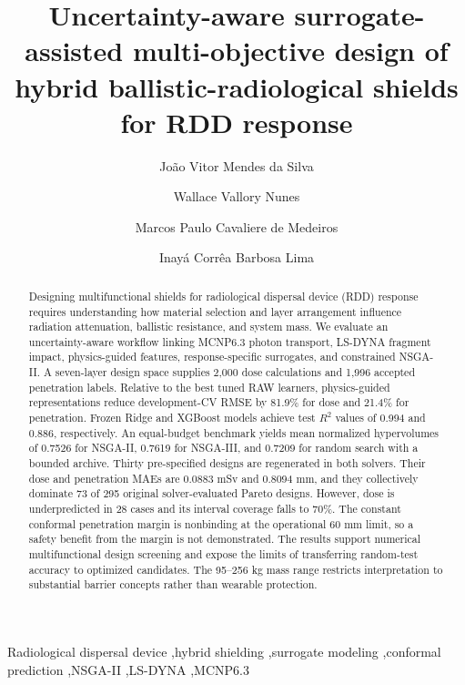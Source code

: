 \documentclass[12pt]{elsarticle}
\begin{document}
	
	\begin{frontmatter}
		
		\title{Uncertainty-aware surrogate-assisted multi-objective design of hybrid ballistic-radiological shields for RDD response}
		
		\author[pen]{Jo\~ao Vitor Mendes da Silva}
		\author[ime]{Wallace Vallory Nunes}
		\author[ime]{Marcos Paulo Cavaliere de Medeiros}
		\author[pen]{Inay\'a Corr\^ea Barbosa Lima}
			
		
		
		\begin{abstract}
Designing multifunctional shields for radiological dispersal device (RDD) response requires understanding how material selection and layer arrangement influence radiation attenuation, ballistic resistance, and system mass. We evaluate an uncertainty-aware workflow linking MCNP6.3 photon transport, LS-DYNA fragment impact, physics-guided features, response-specific surrogates, and constrained NSGA-II. A seven-layer design space supplies 2,000 dose calculations and 1,996 accepted penetration labels. Relative to the best tuned RAW learners, physics-guided representations reduce development-CV RMSE by 81.9\% for dose and 21.4\% for penetration. Frozen Ridge and XGBoost models achieve test $R^2$ values of 0.994 and 0.886, respectively. An equal-budget benchmark yields mean normalized hypervolumes of 0.7526 for NSGA-II, 0.7619 for NSGA-III, and 0.7209 for random search with a bounded archive. Thirty pre-specified designs are regenerated in both solvers. Their dose and penetration MAEs are 0.0883 mSv and 0.8094 mm, and they collectively dominate 73 of 295 original solver-evaluated Pareto designs. However, dose is underpredicted in 28 cases and its interval coverage falls to 70\%. The constant conformal penetration margin is nonbinding at the operational 60 mm limit, so a safety benefit from the margin is not demonstrated. The results support numerical multifunctional design screening and expose the limits of transferring random-test accuracy to optimized candidates. The 95--256 kg mass range restricts interpretation to substantial barrier concepts rather than wearable protection.
\end{abstract}
		
		\begin{keyword}
			Radiological dispersal device \sep hybrid shielding \sep surrogate modeling \sep conformal prediction \sep NSGA-II \sep LS-DYNA \sep MCNP6.3
		\end{keyword}
		
	\end{frontmatter}
	
\end{document}
